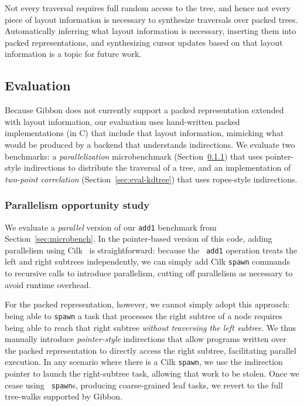 \documentclass[a4paper,english]{lipics-v2016}
\newcommand{\treelang}{Gibbon\xspace} %
\begin{document}
Not every traversal requires full random access to the tree, and hence not
every piece of layout information is necessary to synthesize traversals over
packed trees.
Automatically inferring what layout information is necessary,
inserting them into packed representations, and synthesizing cursor updates based on that layout information is a topic for future work.


\subsection{Evaluation}%
\label{sec:eval-extensions}

Because \treelang{} does not currently support a packed representation extended with layout information, our evaluation uses hand-written packed implementations (in C) that include that layout information, mimicking what would be produced by a backend that understands indirections. We evaluate two benchmarks: a {\em parallelization} microbenchmark (Section~\ref{sec:eval-parallelism}) that uses pointer-style indirections to distribute the traversal of a tree, and an implementation of {\em two-point correlation} (Section~\ref{sec:eval-kdtree}) that uses ropes-style indirections.

\subsubsection{Parallelism opportunity study} \label{sec:eval-parallelism}
\label{sec:eval-parallel}

We evaluate a {\em parallel} version of our {\tt add1} benchmark from
Section~\ref{sec:microbench}. In the pointer-based version of this code,
adding parallelism using Cilk~\cite{cilk} is straightforward: because the {\tt
add1} operation treats the left and right subtrees independently, we can
simply add Cilk {\tt spawn} commands to recursive calls to introduce
parallelism, cutting off parallelism as necessary to avoid runtime overhead.

For the packed representation, however, we cannot simply adopt this approach:
being able to {\tt spawn} a task that processes the right subtree of a node
requires being able to reach that right subtree {\em without traversing the
left subtree}. We thus manually introduce {\em pointer-style} indirections
that allow programs written over the packed representation to directly access
the right subtree, facilitating parallel execution. In any scenario where
there is a Cilk {\tt spawn}, we use the indirection pointer to launch the
right-subtree task, allowing that work to be stolen. Once we cease using {\tt
spawn}s, producing coarse-grained leaf tasks, we revert to the full tree-walks
supported by \treelang{}.
\end{document}
